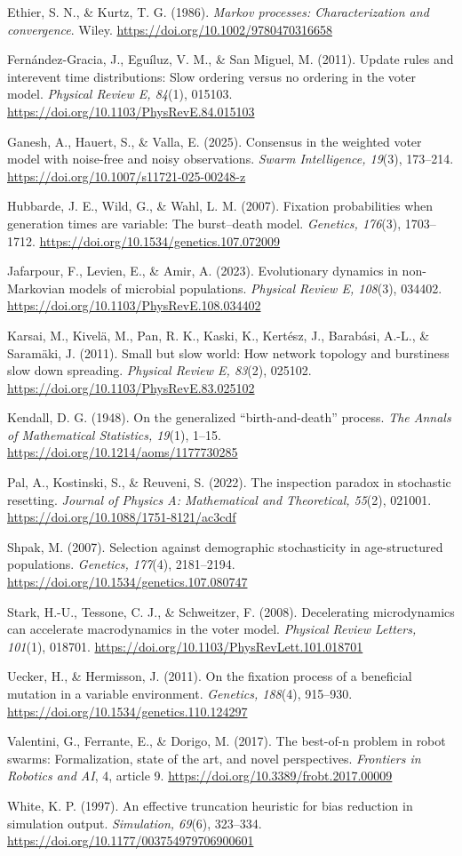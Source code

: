 \documentclass[
  british,
  11pt,
  a4paper,
]{article}
\begin{document}
Ethier, S. N., \& Kurtz, T. G. (1986). \emph{Markov processes:
Characterization and convergence}. Wiley.
\url{https://doi.org/10.1002/9780470316658}

Fernández-Gracia, J., Eguíluz, V. M., \& San Miguel, M. (2011). Update
rules and interevent time distributions: Slow ordering versus no
ordering in the voter model. \emph{Physical Review E, 84}(1), 015103.
\url{https://doi.org/10.1103/PhysRevE.84.015103}

Ganesh, A., Hauert, S., \& Valla, E. (2025). Consensus in the weighted
voter model with noise-free and noisy observations. \emph{Swarm
Intelligence, 19}(3), 173--214.
\url{https://doi.org/10.1007/s11721-025-00248-z}

Hubbarde, J. E., Wild, G., \& Wahl, L. M. (2007). Fixation probabilities
when generation times are variable: The burst--death model.
\emph{Genetics, 176}(3), 1703--1712.
\url{https://doi.org/10.1534/genetics.107.072009}

Jafarpour, F., Levien, E., \& Amir, A. (2023). Evolutionary dynamics in
non-Markovian models of microbial populations. \emph{Physical Review E,
108}(3), 034402. \url{https://doi.org/10.1103/PhysRevE.108.034402}

Karsai, M., Kivelä, M., Pan, R. K., Kaski, K., Kertész, J., Barabási,
A.-L., \& Saramäki, J. (2011). Small but slow world: How network
topology and burstiness slow down spreading. \emph{Physical Review E,
83}(2), 025102. \url{https://doi.org/10.1103/PhysRevE.83.025102}

Kendall, D. G. (1948). On the generalized ``birth-and-death'' process.
\emph{The Annals of Mathematical Statistics, 19}(1), 1--15.
\url{https://doi.org/10.1214/aoms/1177730285}

Pal, A., Kostinski, S., \& Reuveni, S. (2022). The inspection paradox in
stochastic resetting. \emph{Journal of Physics A: Mathematical and
Theoretical, 55}(2), 021001.
\url{https://doi.org/10.1088/1751-8121/ac3cdf}

Shpak, M. (2007). Selection against demographic stochasticity in
age-structured populations. \emph{Genetics, 177}(4), 2181--2194.
\url{https://doi.org/10.1534/genetics.107.080747}

Stark, H.-U., Tessone, C. J., \& Schweitzer, F. (2008). Decelerating
microdynamics can accelerate macrodynamics in the voter model.
\emph{Physical Review Letters, 101}(1), 018701.
\url{https://doi.org/10.1103/PhysRevLett.101.018701}

Uecker, H., \& Hermisson, J. (2011). On the fixation process of a
beneficial mutation in a variable environment. \emph{Genetics, 188}(4),
915--930. \url{https://doi.org/10.1534/genetics.110.124297}

Valentini, G., Ferrante, E., \& Dorigo, M. (2017). The best-of-n problem
in robot swarms: Formalization, state of the art, and novel
perspectives. \emph{Frontiers in Robotics and AI}, 4, article 9.
\url{https://doi.org/10.3389/frobt.2017.00009}

White, K. P. (1997). An effective truncation heuristic for bias
reduction in simulation output. \emph{Simulation, 69}(6), 323--334.
\url{https://doi.org/10.1177/003754979706900601}
\end{document}

